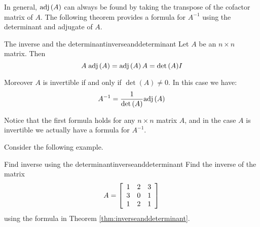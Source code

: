 In general, $\mbox{adj}\left(A\right)$ can always be found by taking the transpose of the cofactor matrix of $A$. The following theorem provides a formula for $A^{-1}$ using the determinant and adjugate of $A$.

\begin{theorem}{The inverse and the determinant}{inverseanddeterminant}
Let $A$ be an  $n\times n$ matrix. Then  
\begin{equation*}
A \; \mbox{adj}\left(A\right) = \mbox{adj}\left(A\right)A = {\det \left(A\right)} I
\end{equation*}

Moreover $A$ is invertible if and only if  $\det \left(A\right) \neq 0$. In this case we have: 
\begin{equation*}
A^{-1} = \frac{1}{\det \left(A\right)}  \mbox{adj}\left(A\right)
\end{equation*}
\end{theorem}


Notice that the first formula holds for any $n \times n$ matrix $A$, and in the case $A$ is invertible we actually have a formula for $A^{-1}$.

Consider the following example.

\begin{example}{Find inverse using the determinant}{inverseanddeterminant}
Find the inverse of the matrix
\begin{equation*}
A=\left[
\begin{array}{rrr}
1 & 2 & 3 \\
3 & 0 & 1 \\
1 & 2 & 1
\end{array}
\right]
\end{equation*}
using the formula in Theorem \ref{thm:inverseanddeterminant}.
\end{example}

